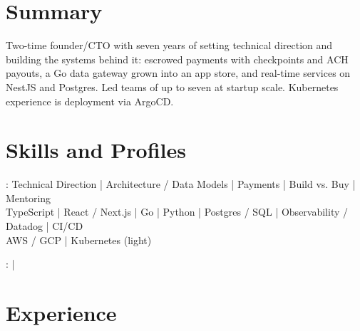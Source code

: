 \documentclass[print]{jack-resume}
\begin{document}
\pagecolor{darkmodeBackground}


\begin{minipage}[t][1cm][t]{.03\textwidth}
    \hfill
\end{minipage}

\section{Summary}
Two-time founder/CTO with seven years of setting technical direction and building the systems behind it: escrowed payments with checkpoints and ACH payouts, a Go data gateway grown into an app store, and real-time services on NestJS and Postgres. Led teams of up to seven at startup scale. Kubernetes experience is deployment via ArgoCD.
\sectionsep

\section{Skills and Profiles}
:
Technical Direction \hfill | \hfill
Architecture / Data Models \hfill | \hfill
Payments \hfill | \hfill
Build vs. Buy \hfill | \hfill
Mentoring \\
\hspace{1.0cm} TypeScript \hfill | \hfill
React / Next.js \hfill | \hfill
Go \hfill | \hfill
Python \hfill | \hfill
Postgres / SQL \hfill | \hfill
Observability / Datadog \hfill | \hfill
CI/CD \\
\hspace{1.0cm} AWS / GCP \hfill | \hfill
Kubernetes (light) \\

\raggedright{
    :
      \href{https://www.linkedin.com/in/jack-sturtevant/}{ \ExternalLink} |
     \href{https://github.com/jacksturt}{ \ExternalLink}}

\section{Experience}
\end{document}
